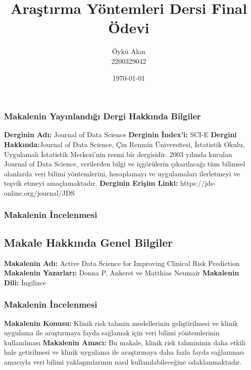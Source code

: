 \documentclass{beamer}
\title{Araştırma Yöntemleri Dersi Final Ödevi}
\author{Öykü Akın\\2200329042}
\institute{Hacettepe Üniversitesi\\İstatistik Bölümü}
\date{\today}
\begin{document}
\begin{frame}
\titlepage
\end{frame}

\begin{frame}
\frametitle{Makalenin Yayınlandığı Dergi Hakkında Bilgiler}
\textbf{Derginin Adı: }Journal of Data Science
\newline
\newline
\textbf{Derginin İndex'i:} SCI-E
\newline
\newline
\textbf{Dergini Hakkında:}Journal of Data Science, Çin Renmin Üniversitesi, İstatistik Okulu, Uygulamalı İstatistik Merkezi'nin resmi bir dergisidir. 2003 yılında kurulan Journal of Data Science, verilerden bilgi ve içgörülerin çıkarılacağı tüm bilimsel alanlarda veri bilimi yöntemlerini, hesaplamayı ve uygulamaları ilerletmeyi ve teşvik etmeyi amaçlamaktadır. 
\newline
\newline
\textbf{Derginin Erişim Linki:}
https://jds-online.org/journal/JDS
\end{frame}

\begin{frame}
\frametitle{Makalenin İncelenmesi}
\subsection{Makale Hakkında Genel Bilgiler}
\textbf{Makalenin Adı: }
Active Data Science for Improving Clinical Risk Prediction
\newline
\newline
\textbf{Makalenin Yazarları:}
Donna P. Ankerst ve Matthias Neumair
\newline
\newline
\textbf{Makalenin Dili:}
İngilizce
\end{frame}

\begin{frame}
\frametitle{Makalenin İncelenmesi}
\textbf{Makalenin Konusu: }
Klinik risk tahmin modellerinin geliştirilmesi ve klinik uygulama ile araştırmaya fayda sağlamak için veri bilimi yöntemlerinin kullanılması
\newline
\newline
\textbf{Makalenin Amacı:}
Bu makale, klinik risk tahmininin daha etkili hale getirilmesi ve klinik uygulama ile araştırmaya daha fazla fayda sağlanması amacıyla veri bilimi yaklaşımlarının nasıl kullanılabileceğine odaklanmaktadır.
\end{frame}
\end{document}
